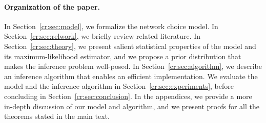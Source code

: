 \paragraph{Organization of the paper.}
In Section~\ref{cr:sec:model}, we formalize the network choice model.
In Section~\ref{cr:sec:relwork}, we briefly review related literature.
In Section~\ref{cr:sec:theory}, we present salient statistical properties of the model and its maximum-likelihood estimator, and we propose a prior distribution that makes the inference problem well-posed.
In Section~\ref{cr:sec:algorithm}, we describe an inference algorithm that enables an efficient implementation.
We evaluate the model and the inference algorithm in Section~\ref{cr:sec:experiments}, before concluding in Section~\ref{cr:sec:conclusion}.
In the appendices, we provide a more in-depth discussion of our model and algorithm, and we present proofs for all the theorems stated in the main text.
